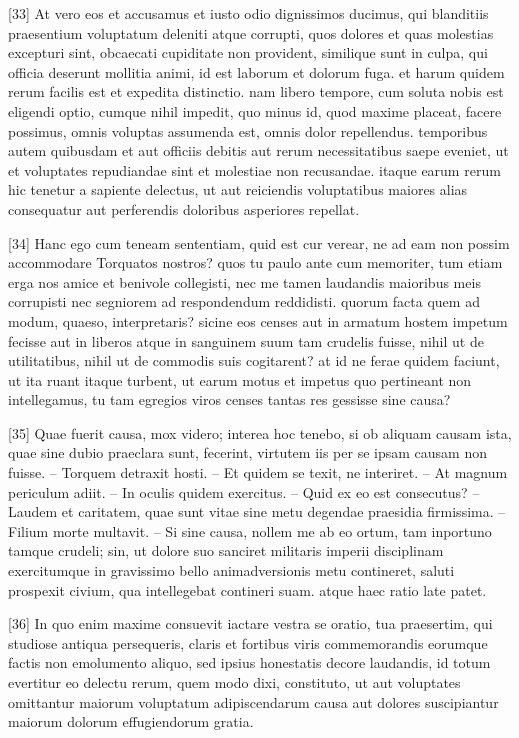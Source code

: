 \documentclass{article}
\begin{document}
[33] At vero eos et accusamus et iusto odio dignissimos ducimus, qui blanditiis praesentium voluptatum deleniti atque corrupti, quos dolores et quas molestias excepturi sint, obcaecati cupiditate non provident, similique sunt in culpa, qui officia deserunt mollitia animi, id est laborum et dolorum fuga. et harum quidem rerum facilis est et expedita distinctio. nam libero tempore, cum soluta nobis est eligendi optio, cumque nihil impedit, quo minus id, quod maxime placeat, facere possimus, omnis voluptas assumenda est, omnis dolor repellendus. temporibus autem quibusdam et aut officiis debitis aut rerum necessitatibus saepe eveniet, ut et voluptates repudiandae sint et molestiae non recusandae. itaque earum rerum hic tenetur a sapiente delectus, ut aut reiciendis voluptatibus maiores alias consequatur aut perferendis doloribus asperiores repellat.

[34] Hanc ego cum teneam sententiam, quid est cur verear, ne ad eam non possim accommodare Torquatos nostros? quos tu paulo ante cum memoriter, tum etiam erga nos amice et benivole collegisti, nec me tamen laudandis maioribus meis corrupisti nec segniorem ad respondendum reddidisti. quorum facta quem ad modum, quaeso, interpretaris? sicine eos censes aut in armatum hostem impetum fecisse aut in liberos atque in sanguinem suum tam crudelis fuisse, nihil ut de utilitatibus, nihil ut de commodis suis cogitarent? at id ne ferae quidem faciunt, ut ita ruant itaque turbent, ut earum motus et impetus quo pertineant non intellegamus, tu tam egregios viros censes tantas res gessisse sine causa?

[35] Quae fuerit causa, mox videro; interea hoc tenebo, si ob aliquam causam ista, quae sine dubio praeclara sunt, fecerint, virtutem iis per se ipsam causam non fuisse. -- Torquem detraxit hosti. -- Et quidem se texit, ne interiret. -- At magnum periculum adiit. -- In oculis quidem exercitus. -- Quid ex eo est consecutus? -- Laudem et caritatem, quae sunt vitae sine metu degendae praesidia firmissima. -- Filium morte multavit. -- Si sine causa, nollem me ab eo ortum, tam inportuno tamque crudeli; sin, ut dolore suo sanciret militaris imperii disciplinam exercitumque in gravissimo bello animadversionis metu contineret, saluti prospexit civium, qua intellegebat contineri suam. atque haec ratio late patet.

[36] In quo enim maxime consuevit iactare vestra se oratio, tua praesertim, qui studiose antiqua persequeris, claris et fortibus viris commemorandis eorumque factis non emolumento aliquo, sed ipsius honestatis decore laudandis, id totum evertitur eo delectu rerum, quem modo dixi, constituto, ut aut voluptates omittantur maiorum voluptatum adipiscendarum causa aut dolores suscipiantur maiorum dolorum effugiendorum gratia.
\end{document}
